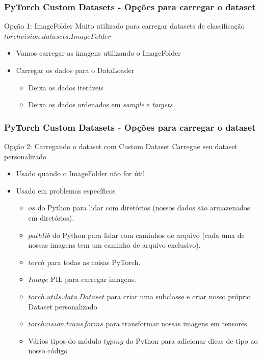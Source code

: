 \documentclass{beamer}
\begin{document}
\begin{frame}
	\frametitle{PyTorch Custom Datasets - Opções para carregar o dataset}
	\begin{block}{Opção 1: ImageFolder}
		Muito utilizado para carregar datasets de classificação $torchvision.datasets.ImageFolder$
		\begin{itemize}
			\item Vamos carregar as imagens utilizando o ImageFolder
			\item Carregar os dados para o DataLoader  
			\begin{itemize}
				\item Deixa os dados iteráveis
				\item Deixa os dados ordenados em \textit{sample} e \textit{targets} 
			\end{itemize}
		\end{itemize}
	\end{block}
\end{frame}
\begin{frame}
	\frametitle{PyTorch Custom Datasets - Opções para carregar o dataset}
	\begin{block}{Opção 2: Carregando o dataset com Custom Dataset}
		Carregue seu dataset personalizado
		\begin{itemize}
			\item Usado quando o ImageFolder não for útil
			\item Usado em problemas específicos
			\begin{itemize}
				\item $os$ do Python para lidar com diretórios (nossos dados são armazenados em diretórios).
				\item $pathlib$ do Python para lidar com caminhos de arquivo (cada uma de nossas imagens tem um caminho de arquivo exclusivo).
				\item $torch$ para todas as coisas PyTorch.
				\item $Image$ PIL para carregar imagens.
				\item $torch.utils.data.Dataset$ para criar uma subclasse e criar nosso próprio Dataset personalizado
				\item $torchvision.transforms$ para transformar nossas imagens em tensores.
				\item Vários tipos do módulo $typing$ do Python para adicionar dicas de tipo ao nosso código
			\end{itemize}
		\end{itemize}
	\end{block}
\end{frame}
\end{document}
